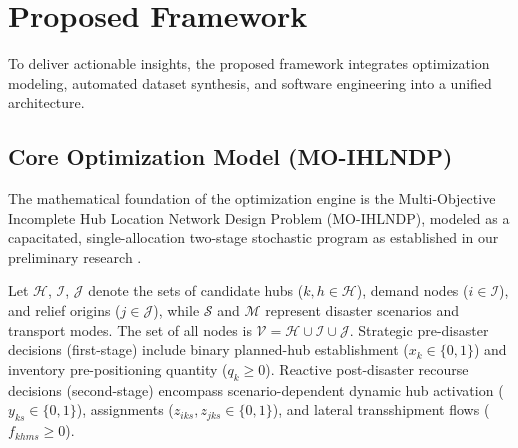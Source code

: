 \documentclass[conference]{IEEEtran}
\begin{document}
\section{Proposed Framework}
To deliver actionable insights, the proposed framework integrates optimization modeling, automated dataset synthesis, and software engineering into a unified architecture.

\subsection{Core Optimization Model (MO-IHLNDP)}
The mathematical foundation of the optimization engine is the Multi-Objective Incomplete Hub Location Network Design Problem (MO-IHLNDP), modeled as a capacitated, single-allocation two-stage stochastic program as established in our preliminary research \cite{letang2026humanitarian}. 

Let $\mathcal{H}$, $\mathcal{I}$, $\mathcal{J}$ denote the sets of candidate hubs ($k,h \in \mathcal{H}$), demand nodes ($i \in \mathcal{I}$), and relief origins ($j \in \mathcal{J}$), while $\mathcal{S}$ and $\mathcal{M}$ represent disaster scenarios and transport modes. The set of all nodes is $\mathcal{V}=\mathcal{H}\cup\mathcal{I}\cup\mathcal{J}$. Strategic pre-disaster decisions (first-stage) include binary planned-hub establishment ($x_k \in \{0,1\}$) and inventory pre-positioning quantity ($q_k \ge 0$). Reactive post-disaster recourse decisions (second-stage) encompass scenario-dependent dynamic hub activation ($y_{ks} \in \{0,1\}$), assignments ($z_{iks}, z_{jks} \in \{0,1\}$), and lateral transshipment flows ($f_{khms} \ge 0$).
\end{document}
